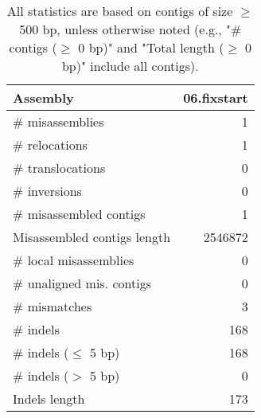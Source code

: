 \documentclass[12pt,a4paper]{article}
\begin{document}
\begin{table}[ht]
\begin{center}
\caption{All statistics are based on contigs of size $\geq$ 500 bp, unless otherwise noted (e.g., "\# contigs ($\geq$ 0 bp)" and "Total length ($\geq$ 0 bp)" include all contigs).}
\begin{tabular}{|l*{1}{|r}|}
\hline
Assembly & 06.fixstart \\ \hline
\# misassemblies & 1 \\ \hline
\hspace{5mm}\# relocations & 1 \\ \hline
\hspace{5mm}\# translocations & 0 \\ \hline
\hspace{5mm}\# inversions & 0 \\ \hline
\# misassembled contigs & 1 \\ \hline
Misassembled contigs length & 2546872 \\ \hline
\# local misassemblies & 0 \\ \hline
\# unaligned mis. contigs & 0 \\ \hline
\# mismatches & 3 \\ \hline
\# indels & 168 \\ \hline
\hspace{5mm}\# indels ($\leq$ 5 bp) & 168 \\ \hline
\hspace{5mm}\# indels ($>$ 5 bp) & 0 \\ \hline
Indels length & 173 \\ \hline
\end{tabular}
\end{center}
\end{table}
\end{document}
